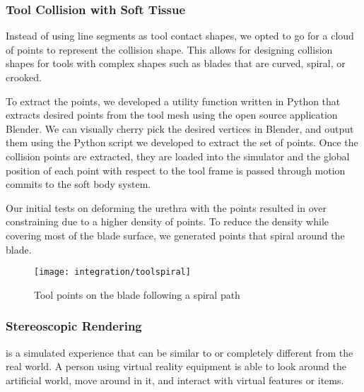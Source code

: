 \subsubsection{Tool Collision with Soft Tissue}
Instead of using line segments as tool contact shapes, we opted to go for a cloud of points to represent the collision shape. This allows for designing collision shapes for tools with complex shapes such as blades that are curved, spiral, or crooked.

To extract the points, we developed a utility function written in Python that extracts desired points from the tool mesh using the open source application Blender. We can visually cherry pick the desired vertices in Blender, and output them using the Python script we developed to extract the set of points. Once the collision points are extracted, they are loaded into the simulator and the global position of each point with respect to the tool frame is passed through motion commits to the soft body system.

Our initial tests on deforming the urethra with the points resulted in over constraining due to a higher density of points. To reduce the density while covering most of the blade surface, we generated points that spiral around the blade.

\begin{figure}
  \centering
  \texttt{[image: integration/toolspiral]}
  \caption{Tool points on the blade following a spiral path}\label{fig:spiral_tool}
\end{figure}


\subsubsection{Stereoscopic Rendering}\label{sec:stereo}
 is a simulated experience that can be similar to or completely different from the real world. A person using virtual reality equipment is able to look around the artificial world, move around in it, and interact with virtual features or items.

